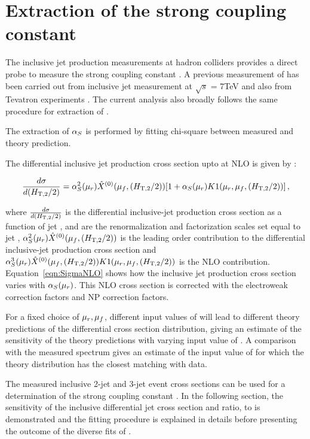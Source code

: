 \chapter{Extraction of the strong coupling constant}
\label{chap:alphas}
The inclusive jet production measurements at hadron colliders provides a direct probe to measure the strong coupling constant \alps.
A previous measurement of \alps has been carried out from inclusive 
jet measurement at $\sqrt{s}$ = 7TeV \cite{Khachatryan:2014waa} and also from Tevatron experiments \cite{D0Alpha1, D0Alpha2}. The current analysis also broadly follows the same procedure for extraction of \alps.

The extraction of $\alpha_S$ is performed by fitting chi-square between measured \httwo and theory prediction.

The differential inclusive jet production cross section upto at NLO is given by \cite{ALPHASCDF}:

 \begin{equation}
 \frac{d\sigma}{d(\httwo)} = \alpha_S^2(\mur)\hat{X}^{(0)}(\muf,(\httwo))[1 + \alpha_S(\mur)K1(\mur, \muf,(\httwo))] \,,
 \label{eqn:SigmaNLO}
 \end{equation}

 where $\frac{d\sigma}{d(\httwo)}$ is the differential inclusive-jet production cross section as a function of jet \httwo, \mur and
\muf are the renormalization and factorization scales set equal to jet \httwo, $\alpha_S^2(\mu_r)\hat{X}^{(0)}(\mu_f,(H_{\mathrm{T,2}}/2))$ is the
leading order contribution to the differential inclusive-jet production cross section and $\alpha_S^3(\mu_r)\hat{X}^{(0)}(\mu_f,(H_{\mathrm{T,2}}/2))K1(\mu_r, \mu_f,(H_{\mathrm{T,2}}/2))$ is the NLO contribution. Equation~\ref{eqn:SigmaNLO} shows how the inclusive jet production cross section varies with $\alpha_S(\mu_r)$. This NLO cross section is corrected with the electroweak correction factors and NP correction factors.

For a fixed choice of $\mu_r, \mu_f$, different input values of \alps will lead to different theory predictions of the differential cross section distribution, giving an estimate of the sensitivity of the theory predictions with varying input value of \alps. A comparison with the measured spectrum gives an estimate of the input value of \alps for which the theory distribution has the closest matching with data.

The measured inclusive 2-jet and 3-jet event cross sections can be used for a determination of the strong coupling constant
\alpsmz. In the following section, the sensitivity of the inclusive differential jet cross section and ratio, \ratio to \alpsmz
is demonstrated and the fitting procedure is explained in details before presenting the outcome of the diverse fits of \alpsmz.

